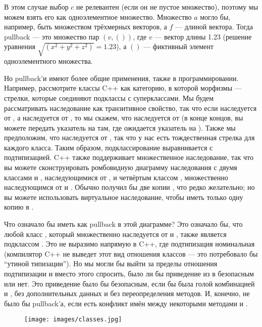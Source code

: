 
В этом случае выбор $c$ не релевантен (если он
не пустое множество), поэтому мы можем взять его как одноэлементное множество.
Множество $a$ могло бы, например, быть множеством трёхмерных векторов,
а $f$ --- длиной вектора. Тогда pullback --- это множество пар
$(v, ())$, где $v$ --- вектор длины 1.23 (решение
уравнения $\sqrt{(x^{2}+y^{2}+z^{2})} = 1.23$), а
$()$ --- фиктивный элемент одноэлементного множества.

Но pullback'и имеют более общие применения, также в программировании. Например,
рассмотрите классы C++ как категорию, в которой морфизмы ---
стрелки, которые соединяют подклассы с суперклассами. Мы будем рассматривать
наследование как транзитивное свойство, так что если  наследуется от , а 
наследуется от , то мы скажем, что  наследуется от  (в конце концов, вы
можете передать указатель на  там, где ожидается указатель на ). Также мы
предположим, что  наследуется от , так что у нас есть тождественная стрелка для каждого
класса. Таким образом, подклассирование выравнивается с подтипизацией. C++ также поддерживает
множественное наследование, так что вы можете сконструировать ромбовидную диаграмму наследования
с двумя классами  и , наследующимися от , и четвёртым классом ,
множественно наследующимся от  и . Обычно  получил бы две копии ,
что редко желательно; но вы можете использовать виртуальное наследование, чтобы иметь
только одну копию  в .

Что означало бы иметь  как pullback в этой диаграмме? Это означало бы,
что любой класс , который множественно наследуется от  и , также является
подклассом . Это не выразимо напрямую в C++, где подтипизация
номинальная (компилятор C++ не выведет этот вид отношения классов
--- это потребовало бы ``утиной типизации''). Но мы могли бы выйти
за пределы отношения подтипизации и вместо этого спросить, было ли бы приведение
из  в  безопасным или нет. Это приведение было бы безопасным, если бы  была
голой комбинацией  и , без дополнительных данных и без
переопределения методов. И, конечно, не было бы pullback'а, если
есть конфликт имён между некоторыми методами  и .

\begin{figure}[H]
  \centering
  \texttt{[image: images/classes.jpg]}
\end{figure}

